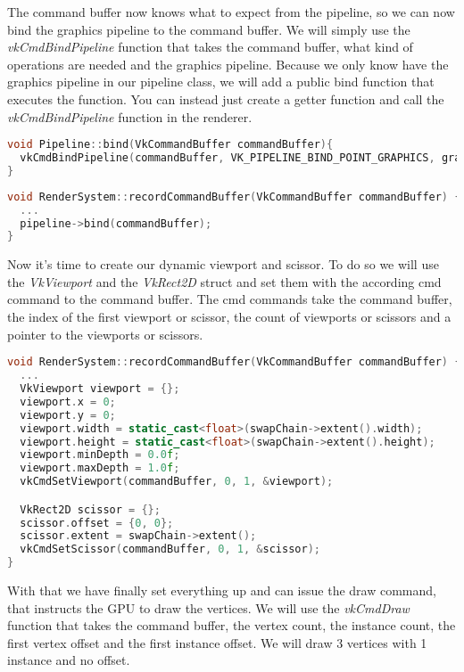 \documentclass[12pt]{report} \usepackage{preamble}
\begin{document}
The command buffer now knows what to expect from the pipeline, so we can now bind the graphics pipeline to the command buffer.
We will simply use the \textit{vkCmdBindPipeline} function that takes the command buffer, what kind of
operations are needed and the graphics pipeline. Because we only know have the graphics pipeline in our pipeline class, we
will add a public bind function that executes the function. You can instead just create a getter function and call the
\textit{vkCmdBindPipeline} function in the renderer.

\begin{lstlisting}[language=C++]
void Pipeline::bind(VkCommandBuffer commandBuffer){
  vkCmdBindPipeline(commandBuffer, VK_PIPELINE_BIND_POINT_GRAPHICS, graphicsPipeline);
}
\end{lstlisting}

\begin{lstlisting}[language=C++]
void RenderSystem::recordCommandBuffer(VkCommandBuffer commandBuffer) {
  ...
  pipeline->bind(commandBuffer);
}
\end{lstlisting}

Now it's time to create our dynamic viewport and scissor. To do so we will use the \textit{VkViewport} and the \textit{VkRect2D}
struct and set them with the according cmd command to the command buffer. The cmd commands take the command buffer, the index
of the first viewport or scissor, the count of viewports or scissors and a pointer to the viewports or scissors.

\begin{lstlisting}[language=C++]
void RenderSystem::recordCommandBuffer(VkCommandBuffer commandBuffer) {
  ...
  VkViewport viewport = {};
  viewport.x = 0;
  viewport.y = 0;
  viewport.width = static_cast<float>(swapChain->extent().width);
  viewport.height = static_cast<float>(swapChain->extent().height);
  viewport.minDepth = 0.0f;
  viewport.maxDepth = 1.0f;
  vkCmdSetViewport(commandBuffer, 0, 1, &viewport);

  VkRect2D scissor = {};
  scissor.offset = {0, 0};
  scissor.extent = swapChain->extent();
  vkCmdSetScissor(commandBuffer, 0, 1, &scissor);
}
\end{lstlisting}

With that we have finally set everything up and can issue the draw command, that instructs the GPU to draw the vertices.
We will use the \textit{vkCmdDraw} function that takes the command buffer, the vertex count, the instance count, the first vertex offset
and the first instance offset. We will draw 3 vertices with 1 instance and no offset.
\end{document}
